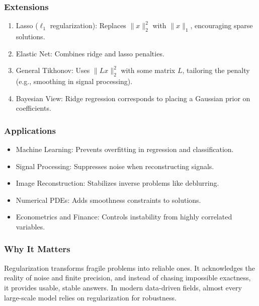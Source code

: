 \documentclass[
  letterpaper,
  DIV=11,
  numbers=noendperiod]{scrreprt}
\providecommand{\tightlist}{%
  \setlength{\itemsep}{0pt}\setlength{\parskip}{0pt}}
\begin{document}
\subsubsection{Extensions}\label{extensions-1}

\begin{enumerate}
\def\labelenumi{\arabic{enumi}.}
\tightlist
\item
  Lasso (\(\ell_1\) regularization): Replaces \(\|x\|_2^2\) with
  \(\|x\|_1\), encouraging sparse solutions.
\item
  Elastic Net: Combines ridge and lasso penalties.
\item
  General Tikhonov: Uses \(\|Lx\|_2^2\) with some matrix \(L\),
  tailoring the penalty (e.g., smoothing in signal processing).
\item
  Bayesian View: Ridge regression corresponds to placing a Gaussian
  prior on coefficients.
\end{enumerate}

\subsubsection{Applications}\label{applications-47}

\begin{itemize}
\tightlist
\item
  Machine Learning: Prevents overfitting in regression and
  classification.
\item
  Signal Processing: Suppresses noise when reconstructing signals.
\item
  Image Reconstruction: Stabilizes inverse problems like deblurring.
\item
  Numerical PDEs: Adds smoothness constraints to solutions.
\item
  Econometrics and Finance: Controls instability from highly correlated
  variables.
\end{itemize}

\subsubsection{Why It Matters}\label{why-it-matters-85}

Regularization transforms fragile problems into reliable ones. It
acknowledges the reality of noise and finite precision, and instead of
chasing impossible exactness, it provides usable, stable answers. In
modern data-driven fields, almost every large-scale model relies on
regularization for robustness.
\end{document}
